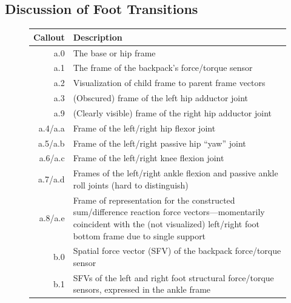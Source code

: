 \subsection{Discussion of Foot Transitions}




 \begin{figure}[htbp]%
 	\centering%
	\resizebox{.85\textwidth}{!}{}\vspace{-.15in}
 	\footnotesize%
 	\begin{tabular}[t]{rl}%
 		\toprule
 		Callout & Description\\
 		\midrule
 		a.0 & The base or hip frame\\
 		a.1 & The frame of the backpack's  force/torque sensor\\
 		a.2 & Visualization of child frame  to parent frame vectors\\
 		a.3 & (Obscured) frame of the left hip adductor joint\\
 		a.9 & (Clearly visible) frame of the right hip adductor joint\\
 		a.4/a.a & Frame of the left/right hip flexor joint\\
 		a.5/a.b & Frame of the left/right passive hip ``yaw'' joint\\
 		a.6/a.c & Frame of the left/right knee flexion joint \\
 		a.7/a.d & \begin{minipage}{2.75in} Frames of the left/right ankle flexion and passive ankle roll joints (hard to distinguish) \end{minipage}\vspace{.025in}\\\vspace{.025in}
 		a.8/a.e & \begin{minipage}{2.75in}Frame of representation for the constructed sum/difference reaction force vectors---momentarily coincident with the (not visualized) left/right foot bottom frame due to single support\end{minipage}\\
 		b.0 & Spatial force vector (SFV) of the backpack force/torque sensor\\
 		b.1 & \begin{minipage}{2.75in}SFVs of the left and right foot structural force/torque sensors, expressed in the ankle frame\end{minipage}\\

\end{tabular}
\end{figure}
